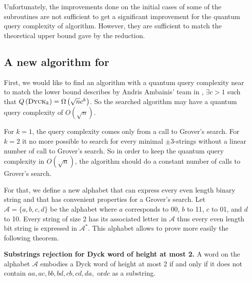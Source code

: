 Unfortunately, the improvements done on the initial cases of some of
the subroutines are not sufficient to get a significant improvement
for the quantum query complexity of  algorithm. However,
they are sufficient to match the theoretical upper bound gave by
the reduction.

\subsection{A new algorithm for }
\label{subsection:dyck2n}

First, we would like to find an algorithm with a quantum query complexity
near to match the lower bound describes by Andris
Ambainis' team in \cite{art:2DGrid}, $\exists c > 1$ such that
$Q\left(\textsc{Dyck$_{k}$}\right)=\Omega\left(\sqrt{n}c^k\right)$. So the
searched algorithm may have a quantum query complexity of
$O\left(\sqrt{n}\right)$.

For $k=1$, the query complexity comes only from a call to Grover's search.
For $k=2$ it no more possible to search for every minimal
$\pm 3$-strings without a linear number of call to Grover's search. So in
order to keep the quantum query complexity in $O\left(\sqrt{n}\right)$,
the algorithm should do a constant number of calls to Grover's search.

For that, we define a new alphabet that can express every even length
binary string and that has convenient properties for a Grover's search.
Let $\mathcal{A} = \{a, b, c, d\}$ be the alphabet where $a$ corresponds
to 00, $b$ to 11, $c$ to 01, and $d$ to 10. Every string of size 2 has
its associated letter in $\mathcal{A}$ thus every even length bit string
is expressed in $\mathcal{A}^*$. This alphabet allows to prove more easily
the following theorem.

\begin{theorem}{\textbf{Substrings rejection for Dyck word of height at most 2.}}
    A word on the alphabet $\mathcal{A}$ embodies a Dyck word of
    height at most 2 if and only if it does not contain $aa, ac, bb,
        bd, cb, cd, da,$ or$ dc$ as a substring.
\end{theorem}

